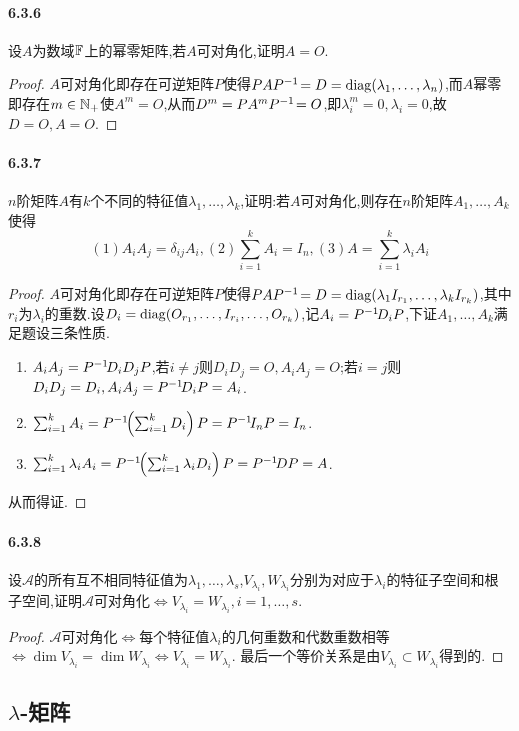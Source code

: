 \documentclass[11pt]{article}
\begin{document}
\paragraph{6.3.6}设$A$为数域$\mathbb{F}$上的幂零矩阵,若$A$可对角化,证明$A=O$.
\begin{proof}
    $A$可对角化即存在可逆矩阵$P$使得$PAP^{-1}\! = D=\operatorname{diag}(\lambda_1,\dots,\lambda_n)$,而$A$幂零即存在$m\in \mathbb{N}_+$使$A^m=O$,从而$D^m=PA^mP^{-1}\!=O$,即$\lambda_i^m=0, \lambda_i=0$,故$D=O,A=O$.
\end{proof}
\paragraph{6.3.7}$n$阶矩阵$A$有$k$个不同的特征值$\lambda_1,\dots,\lambda_k$,证明:若$A$可对角化,则存在$n$阶矩阵$A_1,\dots,A_k$使得
$$(1)A_iA_j=\delta_{ij}A_i, (2)\sum_{i=1}^{k}A_i=I_n, (3)A=\sum_{i=1}^{k}\lambda_i A_i $$
\begin{proof}
    $A$可对角化即存在可逆矩阵$P$使得$PAP^{-1}\! = D = \operatorname{diag}(\lambda_1 I_{r_1},\dots,\lambda_k I_{r_k})$,其中$r_i$为$\lambda_i$的重数.设$D_i=\operatorname{diag}(O_{r_1},\dots,I_{r_i},\dots,O_{r_k})$,记$A_i=P^{-1}\! D_i P$,下证$A_1,\dots,A_k$满足题设三条性质.
    \begin{enumerate}
        \item $A_iA_j=P^{-1}\! D_i D_j P$,若$i\neq j$则$D_iD_j=O, A_iA_j=O$;若$i=j$则$D_iD_j=D_i, A_iA_j=P^{-1}\! D_i P=A_i$.
        \item $\sum_{i=1}^{k}A_i=P^{-1}\!\!\left(\sum_{i=1}^{k}D_i\right)P=P^{-1}\! I_n P=I_n$.
        \item $\sum_{i=1}^{k}\lambda_i A_i=P^{-1}\! \!\left(\sum_{i=1}^{k}\lambda_i D_i\right)P=P^{-1}\! D P=A$.
    \end{enumerate}
    从而得证.
\end{proof}
\paragraph{6.3.8}设$\mathscr{A}$的所有互不相同特征值为$\lambda_1,\dots,\lambda_s$,$V_{\lambda_i},W_{\lambda_i}$分别为对应于$\lambda_i$的特征子空间和根子空间,证明$\mathscr{A}$可对角化$\iff V_{\lambda_i}=W_{\lambda_i}, i=1,\dots,s$.
\begin{proof}
    $\mathscr{A}$可对角化$\iff$每个特征值$\lambda_i$的几何重数和代数重数相等$\iff \dim V_{\lambda_i}=\dim W_{\lambda_i}\iff V_{\lambda_i}=W_{\lambda_i}$. 最后一个等价关系是由$V_{\lambda_i}\subset W_{\lambda_i}$得到的.
\end{proof}

\subsection{$\lambda$-矩阵}
\end{document}
